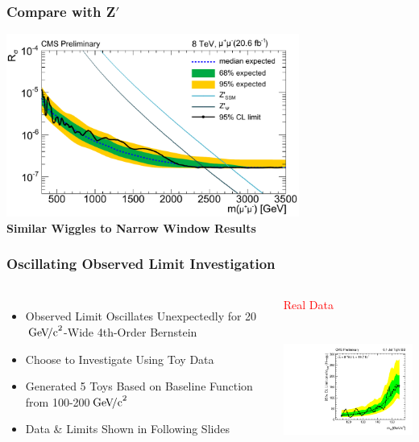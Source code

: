 \documentclass{beamer}
\newcommand{\GeVcc}{\ensuremath{\,\mathrm{Ge\kern -0.1em V\!/c}^2}}
\newcommand{\tred}[1]{\textcolor{red}{#1}}
\begin{document}
\begin{frame}
\frametitle{Compare with Z$'$}
\begin{center}
  \includegraphics[height=60mm]{2013-10-25HggLimitFitRange2/comparisons/zprime_Moriond13_muon}
  \\
\bf  Similar Wiggles to Narrow Window Results
\end{center}
\end{frame}

\begin{frame}
\frametitle{Oscillating Observed Limit Investigation}
  \begin{columns}[c]
    \column{60mm}
      \begin{itemize}
        \item Observed Limit Oscillates Unexpectedly for 20\GeVcc{}-Wide 4th-Order Bernstein
        \item Choose to Investigate Using Toy Data
        \item Generated 5 Toys Based on Baseline Function from 100-200\GeVcc{}
        \item Data \& Limits Shown in Following Slides
      \end{itemize}
    \column{60mm}
      \begin{center}
         \tred{Real Data}\\
          \includegraphics[height=50mm]{2013-10-25HggLimitFitRange2/limitResults/Jets01PassPtG10BB_8TeV}
      \end{center}
  \end{columns}
  \begin{center}
  \end{center}
\end{frame}
\end{document}
